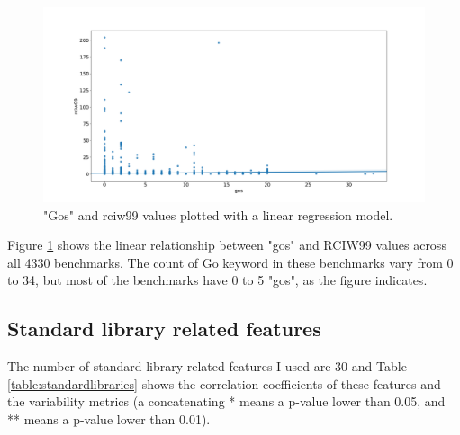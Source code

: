 \documentclass{seal_thesis}
\begin{document}
\begin{figure}[H]
	\centering
	\includegraphics[width=\textwidth]{gosregression}
	\caption{"Gos" and rciw99 values plotted with a linear regression model.}
	\label{fig:gosregression}
\end{figure}

\noindent Figure \ref{fig:gosregression} shows the linear relationship between "gos" and RCIW99 values across all 4330 benchmarks. The count of Go keyword in these benchmarks vary from 0 to 34, but most of the benchmarks have 0 to 5 "gos", as the figure indicates.

\subsection{Standard library related features}
\label{Standard library related features}

The number of standard library related features I used are 30 and Table \ref{table:standardlibraries} shows the correlation coefficients of these features and the variability metrics (a concatenating * means a p-value lower than 0.05, and ** means a p-value lower than 0.01). 
\end{document}
